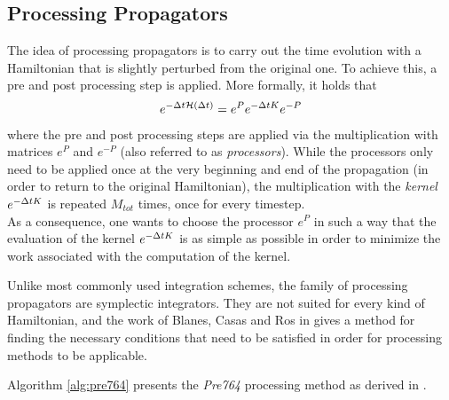 \subsection{Processing Propagators}
\label{sub:pre764_propagator}
%
The idea of processing propagators is to carry out the time evolution with a Hamiltonian that is slightly perturbed from the original one.
To achieve this, a pre and post processing step is applied.
More formally, it holds that
%
\begin{align}
	e^{- \Delta t \mathcal{H} (\Delta t)} = e^P e^{- \Delta t K} e^{-P}
\end{align}
%
where the pre and post processing steps are applied via the multiplication with matrices $e^P$ and $e^{-P}$ (also referred to as \emph{processors}).
While the processors only need to be applied once at the very beginning and end of the propagation (in order to return to the original Hamiltonian), the multiplication with the \emph{kernel} $e^{-\Delta t K}$ is repeated $M_{tot}$ times, once for every timestep. \\
As a consequence, one wants to choose the processor $e^P$ in such a way that the evaluation of the kernel $e^{-\Delta t K}$ is as simple as possible in order to minimize the work associated with the computation of the kernel.
\par\medskip
%
Unlike most commonly used integration schemes, the family of processing propagators are symplectic integrators.
They are not suited for every kind of Hamiltonian, and the work of Blanes, Casas and Ros in \cite{Blanes1999} gives a method for finding the  necessary conditions that need to be satisfied in order for processing methods to be applicable.
\par\medskip
%
Algorithm \ref{alg:pre764} presents the \emph{Pre764} processing method as derived in \cite{Blanes1999}.
%
